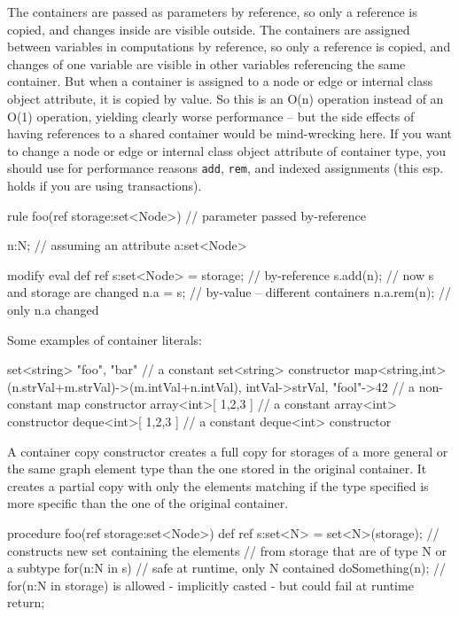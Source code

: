 \begin{example}
The containers are passed as parameters by reference, so only a reference is copied, and changes inside are visible outside.
The containers are assigned between variables in computations by reference, so only a reference is copied, and changes of one variable are visible in other variables referencing the same container.
But when a container is assigned to a node or edge or internal class object attribute, it is copied by value. 
So this is an O(n) operation instead of an O(1) operation, yielding clearly worse performance -- but the side effects of having references to a shared container would be mind-wrecking here.
If you want to change a node or edge or internal class object attribute of container type, you should use for performance reasons \texttt{add}, \texttt{rem}, and indexed assignments (this esp. holds if you are using transactions).
	\begin{grgen}
rule foo(ref storage:set<Node>) // parameter passed by-reference
{
  n:N; // assuming an attribute a:set<Node>
	
  modify {
    eval {
      def ref s:set<Node> = storage; // by-reference
      s.add(n); // now s and storage are changed
      n.a = s; // by-value -- different containers
      n.a.rem(n); // only n.a changed
    }
  }
}
	\end{grgen}
\end{example}

\begin{example}
Some examples of container literals:
\begin{grgen}
set<string>{ "foo", "bar" } // a constant set<string> constructor
map<string,int>{ (n.strVal+m.strVal)->(m.intVal+n.intVal), intVal->strVal, "fool"->42 } // a non-constant map constructor
array<int>[ 1,2,3 ] // a constant array<int> constructor
deque<int>[ 1,2,3 ] // a constant deque<int> constructor
\end{grgen}
\end{example}\label{containerconstructorex}

\begin{example}
A container copy constructor creates a full copy for storages of a more general or the same graph element type than the one stored in the original container.
It creates a partial copy with only the elements matching if the type specified is more specific than the one of the original container.
	\begin{grgen}
procedure foo(ref storage:set<Node>)
{
    def ref s:set<N> = set<N>(storage); // constructs new set containing the elements 
                                        // from storage that are of type N or a subtype
    for(n:N in s) { // safe at runtime, only N contained
      doSomething(n);
    }
    // for(n:N in storage) is allowed - implicitly casted - but could fail at runtime
    return;
}
	\end{grgen}
\end{example}
